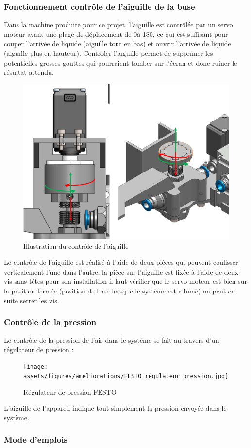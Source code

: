\newpage
\subsubsection{Fonctionnement contrôle de l'aiguille de la buse}
Dans la machine produite pour ce projet, l'aiguille est contrôlée par un servo moteur ayant une plage de déplacement de 0\textdegree à 180\textdegree, ce qui est suffisant
pour couper l'arrivée de liquide (aiguille tout en bas) et ouvrir l'arrivée de liquide (aiguille plus en hauteur). Contrôler l'aiguille permet de supprimer les potentielles
grosses gouttes qui pourraient tomber sur l'écran et donc ruiner le résultat attendu.
\begin{figure}[H]
    \centering
    \includegraphics[width = 1\textwidth]{assets/figures/ameliorations/aiguille_haut_bas.jpg}
    \caption{Illustration du contrôle de l'aiguille}
\end{figure}
Le contrôle de l'aiguille est réalisé à l'aide de deux pièces qui peuvent coulisser verticalement l'une dans l'autre, la pièce sur l'aiguille est fixée à l'aide de deux vis sans têtes
pour son installation il faut vérifier que le servo moteur est bien sur la position fermée (position de base lorsque le système est allumé) on peut en suite serrer les vis.

\newpage
\subsubsection{Contrôle de la pression}
Le contrôle de la pression de l'air dans le système se fait au travers d'un régulateur de pression :
\begin{figure}[H]
    \centering
    \texttt{[image: assets/figures/ameliorations/FESTO\_régulateur\_pression.jpg]}
    \caption{Régulateur de pression FESTO}
\end{figure}
L'aiguille de l'appareil indique tout simplement la pression envoyée dans le système.
\newpage
\subsubsection{Mode d'emplois}

